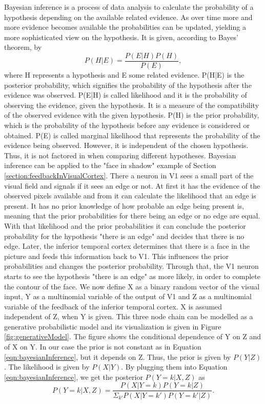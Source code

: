 Bayesian inference is a process of data analysis to calculate the probability of a hypothesis depending on the available related evidence. As over time more and more evidence becomes available the probabilities can be updated, yielding a more sophisticated view on the hypothesis. It is given, according to Bayes' theorem, by
\begin{equation}
\label{eqn:bayesianInference}
P(H|E) = \frac{P(E|H)P(H)}{P(E)},
\end{equation}
where H represents a hypothesis and E some related evidence. P(H|E) is the posterior probability, which signifies the probability of the hypothesis after the evidence was observed. P(E|H) is called likelihood and it is the probability of observing the evidence, given the hypothesis. It is a measure of the compatibility of the observed evidence with the given hypothesis. P(H) is the prior probability, which is the probability of the hypothesis before any evidence is considered or obtained. P(E) is called marginal likelihood that represents the probability of the evidence being observed. However, it is independent of the chosen hypothesis. Thus, it is not factored in when comparing different hypotheses.
Bayesian inference can be applied to the "face in shadow" example of Section \ref{section:feedbackInVisualCortex}. There a neuron in V1 sees a small part of the visual field and signals if it sees an edge or not. At first it has the evidence of the observed pixels available and from it can calculate the likelihood that an edge is present. It has no prior knowledge of how probable an edge being present is, meaning that the prior probabilities for there being an edge or no edge are equal. With that likelihood and the prior probabilities it can conclude the posterior probability for the hypothesis "there is an edge" and decides that there is no edge.
Later, the inferior temporal cortex determines that there is a face in the picture and feeds this information back to V1. This influences the prior probabilities and changes the posterior probability. Through that, the V1 neuron starts to see the hypothesis  "there is an edge" as more likely, in order to complete the contour of the face. 
We now define X as a binary random vector of the visual input, Y as a multinomial variable of the output of V1 and Z as a multinomial variable of the feedback of the inferior temporal cortex. X is assumed independent of Z, when Y is given. This three node chain can be modelled as a generative probabilistic model and its visualization is given in Figure \ref{fig:generativeModel}. The figure shows the conditional dependence of Y on Z and of X on Y. In our case the prior is not constant as in Equation \ref{eqn:bayesianInference}, but it depends on Z. Thus, the prior is given by $P(Y|Z)$. The likelihood is given by $P(X|Y)$. By plugging them into Equation \ref{eqn:bayesianInference}, we get the posterior $P(Y=k|X,Z)$ as
\begin{equation}
\label{eqn:pYvorausgesetztXUndZ}
P(Y = k|X, Z) = \frac{P(X|Y=k)P(Y = k|Z)}{\Sigma_{k'}P(X|Y=k')P(Y=k'|Z)}.
\end{equation}

